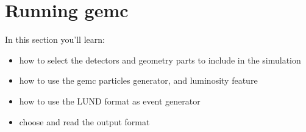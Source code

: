 \section{Running gemc}


In this section you'll learn:
\begin{itemize}
\item how to select the detectors and geometry parts to include in the simulation
\item how to use the gemc particles generator, and luminosity feature
\item how to use the LUND format as event generator
\item choose and read the output format
\end{itemize}

\subsection{}